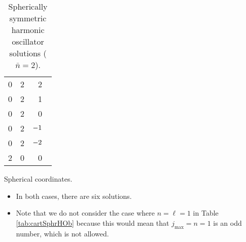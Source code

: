\documentclass[../notes.tex]{subfiles}
\begin{document}
\begin{itemize}
\begin{table}[h!]
\begin{subtable}{0.3\linewidth}
\begin{tabular}{c|c|c}
                \hline
                0 & 2 & 2\\
                0 & 2 & 1\\
                0 & 2 & 0\\
                0 & 2 & $-1{\color{white}-}$\\
                0 & 2 & $-2{\color{white}-}$\\
                2 & 0 & 0\\
            \end{tabular}
            \caption{Spherical coordinates.}
            \label{tab:cartSphrHOb}
        \end{subtable}
        \caption{Spherically symmetric harmonic oscillator solutions ($\bar{n}=2$).}
        \label{tab:cartSphrHO}
    \end{table}
    \begin{itemize}
        \item In both cases, there are six solutions.
        \item Note that we do not consider the case where $n=\ell=1$ in Table \ref{tab:cartSphrHOb} because this would mean that $j_\text{max}=n=1$ is an odd number, which is not allowed.
    \end{itemize}
\end{itemize}
\end{document}
